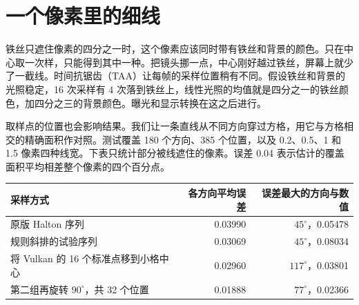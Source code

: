 \clearpage
\begingroup
{}
\setlength{\parindent}{2\ccwd}
\section{一个像素里的细线}

铁丝只遮住像素的四分之一时，这个像素应该同时带有铁丝和背景的颜色。只在中心取一次样，只能得到其中一种。把镜头挪一点，中心刚好越过铁丝，屏幕上就少了一截线。时间抗锯齿（TAA）让每帧的采样位置稍有不同。假设铁丝和背景的光照稳定，16 次采样有 4 次落到铁丝上，线性光照的均值就是四分之一的铁丝颜色，加四分之三的背景颜色。曝光和显示转换在这之后进行。

\begin{center}
\end{center}

取样点的位置也会影响结果。我们让一条直线从不同方向穿过方格，用它与方格相交的精确面积作对照。测试覆盖 180 个方向、385 个位置，以及 0.2、0.5、1 和 1.5 像素四种线宽。下表只统计部分被线遮住的像素。误差 0.04 表示估计的覆盖面积平均相差整个像素的四个百分点。

{\smalltable\noindent\begin{tabularx}{\linewidth}{@{}Xrr@{}}\toprule
采样方式 & 各方向平均误差 & 误差最大的方向与数值\\\midrule
原版 Halton 序列 & 0.03990 & $45^\circ$，0.05478\\
规则斜排的试验序列 & 0.03069 & $45^\circ$，0.08034\\
将 Vulkan 的 16 个标准点移到小格中心 & 0.02960 & $117^\circ$，0.03801\\
第二组再旋转 $90^\circ$，共 32 个位置 & 0.01888 & $77^\circ$，0.02366\\\bottomrule
\end{tabularx}\par}

